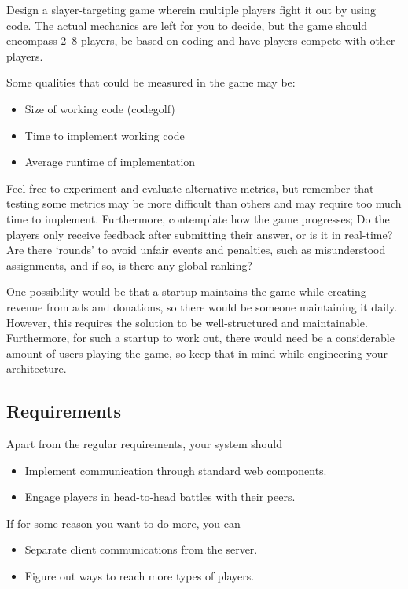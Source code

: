 \begin{refsection}
Design a slayer-targeting game wherein multiple players fight it out by using code. The actual mechanics are left for you to decide, but the game should encompass 2--8 players, be based on coding and have players compete with other players.

Some qualities that could be measured in the game may be:
    \begin{itemize}
        \item Size of working code (codegolf)
        \item Time to implement working code
        \item Average runtime of implementation
    \end{itemize}
Feel free to experiment and evaluate alternative metrics, but remember that testing some metrics may be more difficult than others and may require too much time to implement. Furthermore, contemplate how the game progresses; Do the players only receive feedback after submitting their answer, or is it in real-time? Are there `rounds' to avoid unfair events and penalties, such as misunderstood assignments, and if so, is there any global ranking?

One possibility would be that a startup maintains the game while creating revenue from ads and donations, so there would be someone maintaining it daily. However, this requires the solution to be well-structured and maintainable. Furthermore, for such a startup to work out, there would need be a considerable amount of users playing the game, so keep that in mind while engineering your architecture.

\subsection*{Requirements}
Apart from the regular requirements, your system should
\begin{itemize}
    \item Implement communication through standard web components.
    \item Engage players in head-to-head battles with their peers.
\end{itemize}
If for some reason you want to do more, you can
\begin{itemize}
    \item Separate client communications from the server.
    \item Figure out ways to reach more types of players.
\end{itemize}

\end{refsection}
